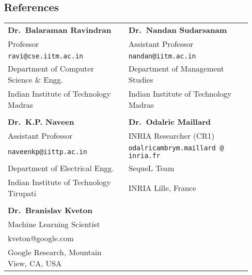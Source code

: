 \documentclass[margin,11pt]{res}
\begin{document}
\begin{resume}
\section{References}
\begin{tabular}{lll}
\textbf{Dr.~Balaraman Ravindran} & \textbf{Dr.~Nandan Sudarsanam} \\
Professor & Assistant Professor\\
\texttt{ravi@cse.iitm.ac.in} & \texttt{nandan@iitm.ac.in}\\
Department of Computer Science \& Engg. & Department of Management Studies\\ 
Indian Institute of Technology Madras & Indian Institute of Technology Madras\\
\\
\textbf{Dr.~K.P. Naveen}  & \textbf{Dr.~Odalric Maillard} \\
Assistant Professor & INRIA Researcher (CR1) \\
\texttt{naveenkp@iittp.ac.in} & \texttt{odalricambrym.maillard @ inria.fr}\\
Department of Electrical Engg. & SequeL Team \\ 
Indian Institute of Technology Tirupati & INRIA Lille, France\\
\\
\textbf{Dr.~Branislav Kveton}\\
Machine Learning Scientist\\
kveton@google.com\\
Google Research, Mountain View, CA, USA
\end{tabular}



\end{resume}
\end{document}
